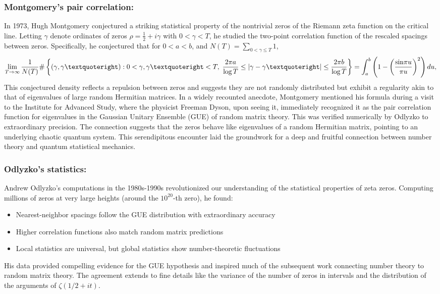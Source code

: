 \documentclass{article}
\def\sin{{{\rm sin}}}
\begin{document}
\subsubsection{Montgomery's pair correlation:}     
    In 1973, Hugh Montgomery \cite{Montgomery,MontgomeryPair}  conjectured a striking statistical property of the nontrivial zeros of the Riemann zeta function on the critical line. Letting $\gamma$ denote ordinates of zeros $\rho = \tfrac{1}{2} + i\gamma$ with $0 < \gamma < T$, he studied the two-point correlation function of the rescaled spacings between zeros. Specifically, he conjectured that for $0 < a < b$, and $N(T)=\sum_{0<\gamma \leq T} 1$,
$$
\lim_{T \to \infty} \frac{1}{N(T)} \# \left\{ (\gamma, \gamma’) : 0 < \gamma, \gamma’ < T,\; \frac{2\pi a}{\log T} \leq |\gamma - \gamma’| \leq \frac{2\pi b}{\log T} \right\} = \int_a^b \left( 1 - \left( \frac{\sin \pi u}{\pi u} \right)^2 \right) du,
$$
 This conjectured density reflects a repulsion between zeros and suggests they are not randomly distributed but exhibit a regularity akin to that of eigenvalues of large random Hermitian matrices. In a widely recounted anecdote, Montgomery mentioned his formula during a visit to the Institute for Advanced Study, where the physicist Freeman Dyson, upon seeing it, immediately recognized it as the pair correlation function for eigenvalues in the Gaussian Unitary Ensemble (GUE) of random matrix theory. This was verified numerically by Odlyzko to extraordinary precision. The connection suggests that the zeros behave like eigenvalues of a random Hermitian matrix, pointing to an underlying chaotic quantum system.
 This serendipitous encounter laid the groundwork for a deep and fruitful connection between number theory and quantum statistical mechanics.
    
    \subsubsection{Odlyzko's statistics:} Andrew Odlyzko's computations in the 1980s-1990s revolutionized our understanding of the statistical properties of zeta zeros. Computing millions of zeros at very large heights (around the $10^{20}$-th zero), he found:
    \begin{itemize}
        \item Nearest-neighbor spacings follow the GUE distribution with extraordinary accuracy
        \item Higher correlation functions also match random matrix predictions
        \item Local statistics are universal, but global statistics show number-theoretic fluctuations
    \end{itemize}
    His data provided compelling evidence for the GUE hypothesis and inspired much of the subsequent work connecting number theory to random matrix theory. The agreement extends to fine details like the variance of the number of zeros in intervals and the distribution of the arguments of $\zeta(1/2 + it)$.\newline
    
\end{document}
